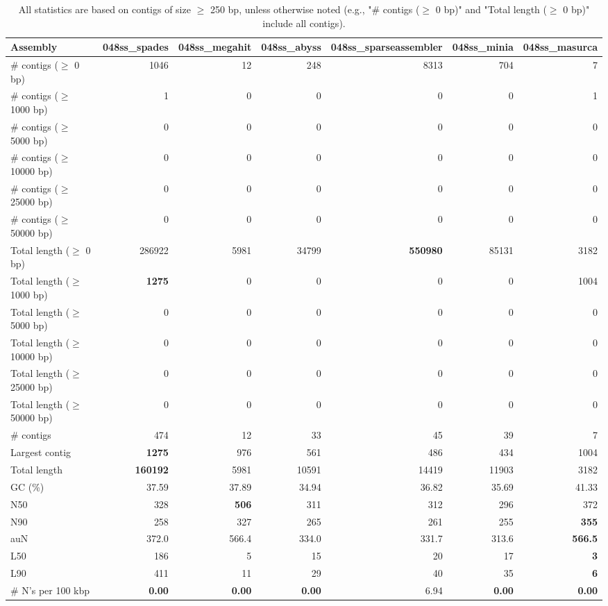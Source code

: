 \documentclass[12pt,a4paper]{article}
\begin{document}
\begin{table}[ht]
\begin{center}
\caption{All statistics are based on contigs of size $\geq$ 250 bp, unless otherwise noted (e.g., "\# contigs ($\geq$ 0 bp)" and "Total length ($\geq$ 0 bp)" include all contigs).}
\begin{tabular}{|l*{6}{|r}|}
\hline
Assembly & 048ss\_spades & 048ss\_megahit & 048ss\_abyss & 048ss\_sparseassembler & 048ss\_minia & 048ss\_masurca \\ \hline
\# contigs ($\geq$ 0 bp) & 1046 & 12 & 248 & 8313 & 704 & 7 \\ \hline
\# contigs ($\geq$ 1000 bp) & 1 & 0 & 0 & 0 & 0 & 1 \\ \hline
\# contigs ($\geq$ 5000 bp) & 0 & 0 & 0 & 0 & 0 & 0 \\ \hline
\# contigs ($\geq$ 10000 bp) & 0 & 0 & 0 & 0 & 0 & 0 \\ \hline
\# contigs ($\geq$ 25000 bp) & 0 & 0 & 0 & 0 & 0 & 0 \\ \hline
\# contigs ($\geq$ 50000 bp) & 0 & 0 & 0 & 0 & 0 & 0 \\ \hline
Total length ($\geq$ 0 bp) & 286922 & 5981 & 34799 & {\bf 550980} & 85131 & 3182 \\ \hline
Total length ($\geq$ 1000 bp) & {\bf 1275} & 0 & 0 & 0 & 0 & 1004 \\ \hline
Total length ($\geq$ 5000 bp) & 0 & 0 & 0 & 0 & 0 & 0 \\ \hline
Total length ($\geq$ 10000 bp) & 0 & 0 & 0 & 0 & 0 & 0 \\ \hline
Total length ($\geq$ 25000 bp) & 0 & 0 & 0 & 0 & 0 & 0 \\ \hline
Total length ($\geq$ 50000 bp) & 0 & 0 & 0 & 0 & 0 & 0 \\ \hline
\# contigs & 474 & 12 & 33 & 45 & 39 & 7 \\ \hline
Largest contig & {\bf 1275} & 976 & 561 & 486 & 434 & 1004 \\ \hline
Total length & {\bf 160192} & 5981 & 10591 & 14419 & 11903 & 3182 \\ \hline
GC (\%) & 37.59 & 37.89 & 34.94 & 36.82 & 35.69 & 41.33 \\ \hline
N50 & 328 & {\bf 506} & 311 & 312 & 296 & 372 \\ \hline
N90 & 258 & 327 & 265 & 261 & 255 & {\bf 355} \\ \hline
auN & 372.0 & 566.4 & 334.0 & 331.7 & 313.6 & {\bf 566.5} \\ \hline
L50 & 186 & 5 & 15 & 20 & 17 & {\bf 3} \\ \hline
L90 & 411 & 11 & 29 & 40 & 35 & {\bf 6} \\ \hline
\# N's per 100 kbp & {\bf 0.00} & {\bf 0.00} & {\bf 0.00} & 6.94 & {\bf 0.00} & {\bf 0.00} \\ \hline
\end{tabular}
\end{center}
\end{table}
\end{document}
